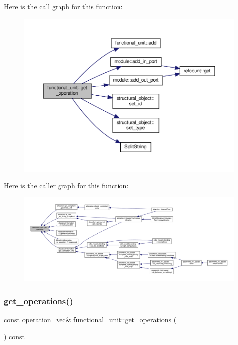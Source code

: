Here is the call graph for this function\+:
\nopagebreak
\begin{figure}[H]
\begin{center}
\leavevmode
\includegraphics[width=350pt]{d8/dd6/structfunctional__unit_a4e2dee20e6116b84d95e97b9ccbb3e7d_cgraph}
\end{center}
\end{figure}
Here is the caller graph for this function\+:
\nopagebreak
\begin{figure}[H]
\begin{center}
\leavevmode
\includegraphics[width=350pt]{d8/dd6/structfunctional__unit_a4e2dee20e6116b84d95e97b9ccbb3e7d_icgraph}
\end{center}
\end{figure}
\mbox{\label{structfunctional__unit_acf734bdfd3d41b4ce83ea6553b6ba051}} 
\subsubsection{\texorpdfstring{get\+\_\+operations()}{get\_operations()}}
{\footnotesize\ttfamily const \hyperlink{structfunctional__unit_a95afca234ddcc2e13d56d6e5eb53557a}{operation\+\_\+vec}\& functional\+\_\+unit\+::get\+\_\+operations (\begin{DoxyParamCaption}{ }\end{DoxyParamCaption}) const\hspace{0.3cm}{\ttfamily [inline]}}



